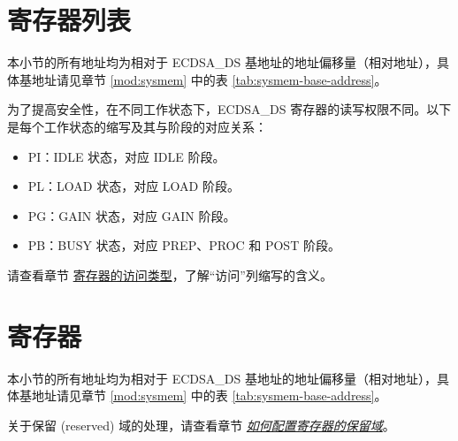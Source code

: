 \documentclass[main\_\_CN.tex]{subfiles}
\begin{document}

\newpage
\hypertarget{ecdsa-reg-summ}{}
\section{寄存器列表}
\label{sec:ecdsa-reg-summ}

本小节的所有地址均为相对于 ECDSA\_DS 基地址的地址偏移量（相对地址），具体基地址请见章节 \ref{mod:sysmem} \textit{} 中的表 \ref{tab:sysmem-base-address}。

为了提高安全性，在不同工作状态下，ECDSA\_DS 寄存器的读写权限不同。以下是每个工作状态的缩写及其与阶段的对应关系：

\begin{itemize}
    \item PI：IDLE 状态，对应 IDLE 阶段。
    \item PL：LOAD 状态，对应 LOAD 阶段。
    \item PG：GAIN 状态，对应 GAIN 阶段。
    \item PB：BUSY 状态，对应 PREP、PROC 和 POST 阶段。
\end{itemize}

请查看章节 \hyperref[glossary-access-types]{寄存器的访问类型}，了解“访问”列缩写的含义。






\newpage
\section{寄存器}

本小节的所有地址均为相对于 ECDSA\_DS 基地址的地址偏移量（相对地址），具体基地址请见章节 \ref{mod:sysmem} \textit{} 中的表 \ref{tab:sysmem-base-address}。

关于保留 (reserved) 域的处理，请查看章节 \hyperref[programming-reserved-field]{\textit{如何配置寄存器的保留域}}。


\end{document}
